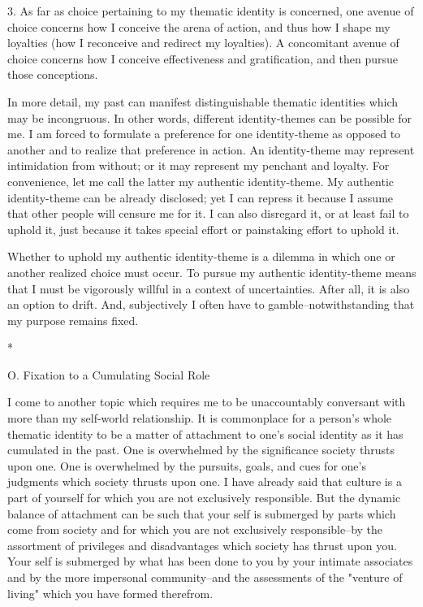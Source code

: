 3. As far as choice pertaining to my thematic identity is concerned, one avenue of choice concerns how I conceive the arena of action, and thus how I shape my loyalties (how I reconceive and redirect my loyalties). A concomitant avenue of choice concerns how I conceive effectiveness and gratification, and then pursue those conceptions.

In more detail, my past can manifest distinguishable thematic identities which may be incongruous. In other words, different identity-themes can be possible for me. I am forced to formulate a preference for one identity-theme as opposed to another and to realize that preference in action. An identity-theme may represent intimidation from without; or it may represent my penchant and loyalty. For convenience, let me call the latter my authentic identity-theme. My authentic identity-theme can be already disclosed; yet I can repress it because I assume that other people will censure me for it. I can also disregard it, or at least fail to uphold it, just because it takes special effort or painstaking effort to uphold it.

Whether to uphold my authentic identity-theme is a dilemma in which one or another realized choice must occur. To pursue my authentic identity-theme means that I must be vigorously willful in a context of uncertainties. After all, it is also an option to drift. And, subjectively I often have to gamble--notwithstanding that my purpose remains fixed.

*

O. Fixation to a Cumulating Social Role

I come to another topic which requires me to be unaccountably conversant with more than my self-world relationship. It is commonplace for a person's whole thematic identity to be a matter of attachment to one's social identity as it has cumulated in the past. One is overwhelmed by the significance society thrusts upon one. One is overwhelmed by the pursuits, goals, and cues for one's judgments which society thrusts upon one. I have already said that culture is a part of yourself for which you are not exclusively responsible. But the dynamic balance of attachment can be such that your self is submerged by parts which come from society and for which you are not exclusively responsible--by the assortment of privileges and disadvantages which society has thrust upon you. Your self is submerged by what has been done to you by your intimate associates and by the more impersonal community--and the assessments of the "venture of living" which you have formed therefrom.

